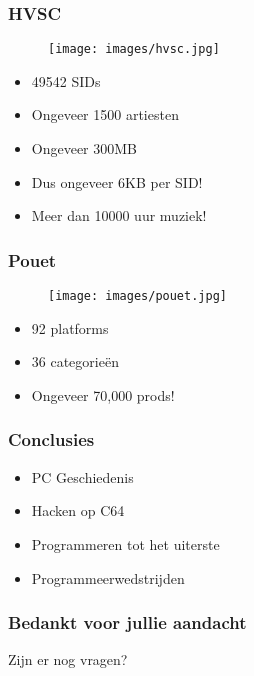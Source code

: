 \documentclass[aspectratio=43]{uva-inf-presentation}
\begin{document}

\begin{frame}
\frametitle{HVSC}

\begin{figure}
\texttt{[image: images/hvsc.jpg]}
\end{figure}

\begin{itemize}
\item 49542 SIDs
\item Ongeveer 1500 artiesten
\item Ongeveer 300MB
\item Dus ongeveer 6KB per SID!
\item Meer dan 10000 uur muziek!
\end{itemize}

\end{frame}


\begin{frame}
\frametitle{Pouet}

\begin{figure}
\texttt{[image: images/pouet.jpg]}
\end{figure}

\begin{itemize}
\item 92 platforms
\item 36 categorie\"en
\item Ongeveer 70,000 prods!
\end{itemize}

\end{frame}


\begin{frame}
\frametitle{Conclusies}

\begin{itemize}
\item PC Geschiedenis
\item Hacken op C64
\item Programmeren tot het uiterste
\item Programmeerwedstrijden
\end{itemize}

\end{frame}





\begin{frame}[noframenumbering]
\frametitle{Bedankt voor jullie aandacht}
\Large{\centerline{Zijn er nog vragen?}}
\end{frame}
\end{document}
